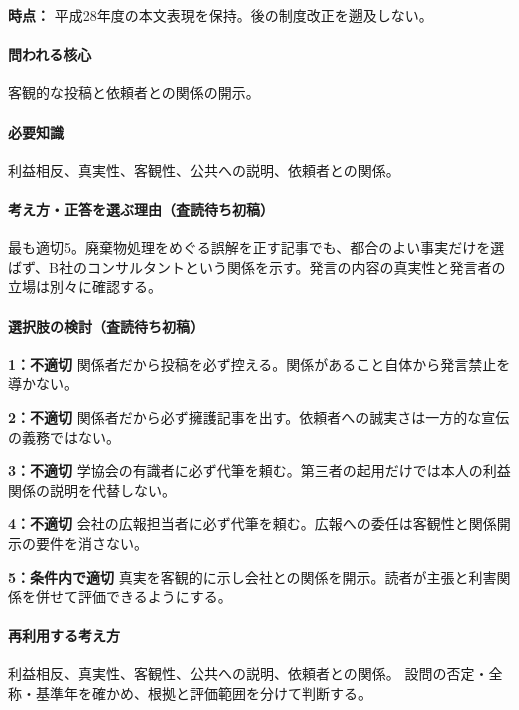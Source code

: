 \noindent\textbf{時点：} 平成28年度の本文表現を保持。後の制度改正を遡及しない。\par

\paragraph{問われる核心} 客観的な投稿と依頼者との関係の開示。

\paragraph{必要知識} 利益相反、真実性、客観性、公共への説明、依頼者との関係。

\paragraph{考え方・正答を選ぶ理由（査読待ち初稿）} 最も適切5。廃棄物処理をめぐる誤解を正す記事でも、都合のよい事実だけを選ばず、B社のコンサルタントという関係を示す。発言の内容の真実性と発言者の立場は別々に確認する。

\paragraph{選択肢の検討（査読待ち初稿）}\mbox{}\par

\noindent\textbf{1：不適切} 関係者だから投稿を必ず控える。関係があること自体から発言禁止を導かない。\par

\noindent\textbf{2：不適切} 関係者だから必ず擁護記事を出す。依頼者への誠実さは一方的な宣伝の義務ではない。\par

\noindent\textbf{3：不適切} 学協会の有識者に必ず代筆を頼む。第三者の起用だけでは本人の利益関係の説明を代替しない。\par

\noindent\textbf{4：不適切} 会社の広報担当者に必ず代筆を頼む。広報への委任は客観性と関係開示の要件を消さない。\par

\noindent\textbf{5：条件内で適切} 真実を客観的に示し会社との関係を開示。読者が主張と利害関係を併せて評価できるようにする。\par

\paragraph{再利用する考え方} 利益相反、真実性、客観性、公共への説明、依頼者との関係。 設問の否定・全称・基準年を確かめ、根拠と評価範囲を分けて判断する。

